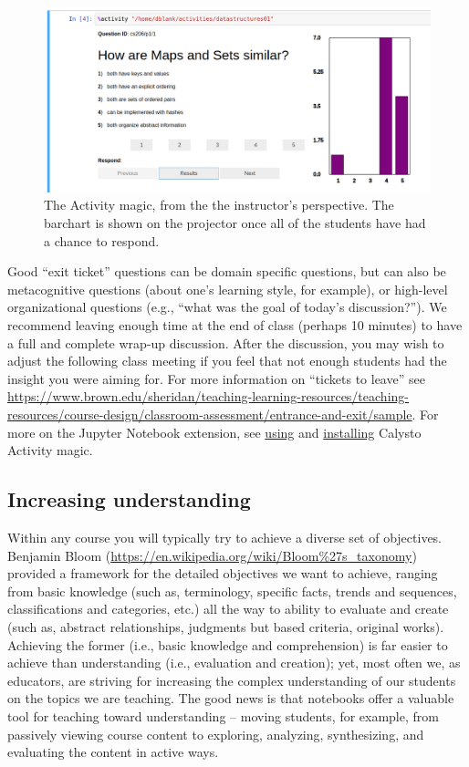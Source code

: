 \documentclass[]{book}
\begin{document}
\begin{figure}
\centering
\includegraphics{images/activity-magic-instructor.png}
\caption{The Activity magic, from the the instructor's perspective. The
barchart is shown on the projector once all of the students have had a
chance to respond.}
\end{figure}

Good ``exit ticket'' questions can be domain specific questions, but can
also be metacognitive questions (about one's learning style, for
example), or high-level organizational questions (e.g., ``what was the
goal of today's discussion?''). We recommend leaving enough time at the
end of class (perhaps 10 minutes) to have a full and complete wrap-up
discussion. After the discussion, you may wish to adjust the following
class meeting if you feel that not enough students had the insight you
were aiming for. For more information on ``tickets to leave'' see
\url{https://www.brown.edu/sheridan/teaching-learning-resources/teaching-resources/course-design/classroom-assessment/entrance-and-exit/sample}.
For more on the Jupyter Notebook extension, see
\href{https://github.com/Calysto/metakernel/blob/master/metakernel/magics/README.md\#activity}{using}
and
\href{https://github.com/Calysto/metakernel\#use-metakernel-magics-in-ipython}{installing}
Calysto Activity magic.

\subsection{Increasing understanding}\label{increasing-understanding}

Within any course you will typically try to achieve a diverse set of
objectives. Benjamin Bloom
(\url{https://en.wikipedia.org/wiki/Bloom\%27s_taxonomy}) provided a
framework for the detailed objectives we want to achieve, ranging from
basic knowledge (such as, terminology, specific facts, trends and
sequences, classifications and categories, etc.) all the way to ability
to evaluate and create (such as, abstract relationships, judgments but
based criteria, original works). Achieving the former (i.e., basic
knowledge and comprehension) is far easier to achieve than understanding
(i.e., evaluation and creation); yet, most often we, as educators, are
striving for increasing the complex understanding of our students on the
topics we are teaching. The good news is that notebooks offer a valuable
tool for teaching toward understanding -- moving students, for example,
from passively viewing course content to exploring, analyzing,
synthesizing, and evaluating the content in active ways.
\end{document}
